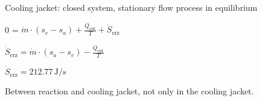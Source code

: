 Cooling jacket: closed system, stationary flow process in equilibrium  

0 = \( \dot{m} \cdot (s_e - s_a) + \frac{\dot{Q}_{\text{out}}}{T} + \dot{S}_{\text{erz}} \)  

\( \dot{S}_{\text{erz}} = \dot{m} \cdot (s_a - s_e) - \frac{\dot{Q}_{\text{out}}}{T} \)  

\( \dot{S}_{\text{erz}} = 212.77 \, \text{J/s} \)  

Between reaction and cooling jacket, not only in the cooling jacket.